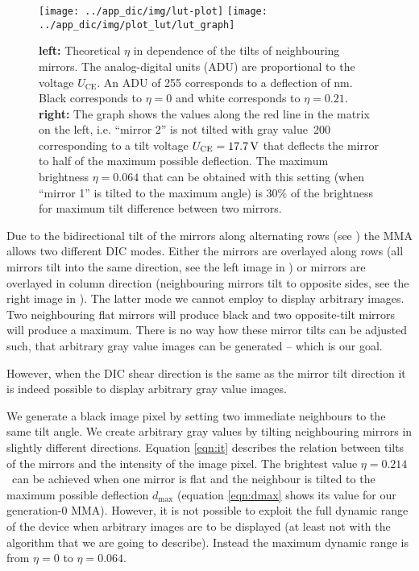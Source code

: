 \begin{figure}[htb]
  \centering
  \texttt{[image: ../app\_dic/img/lut-plot]}
  \texttt{[image: ../app\_dic/img/plot\_lut/lut\_graph]}
  \caption{{\bf left:} Theoretical $\eta$ in dependence of the tilts
    of neighbouring mirrors. The analog-digital units (ADU) are
    proportional to the voltage $U_\textrm{CE}$. An ADU of 255
    corresponds to a deflection of \unit[134]{nm}. Black corresponds
    to $\eta=0$ and white corresponds to $\eta=0.21$. {\bf right:} The
    graph shows the values along the red line in the matrix on the
    left, i.e. ``mirror 2'' is not tilted with gray value~200
    corresponding to a tilt voltage $U_\textrm{CE}=\unit[17.7]{V}$
    that deflects the mirror to half of the maximum possible
    deflection. The maximum brightness $\eta=0.064$ that can be
    obtained with this setting (when ``mirror 1'' is tilted to the
    maximum angle) is $30\%$ of the brightness for maximum tilt
    difference between two mirrors.}
  \label{fig:deflection2}
\end{figure}

Due to the bidirectional tilt of the mirrors along alternating rows
(see ) the MMA allows two different DIC modes.
Either the mirrors are overlayed along rows (all mirrors tilt into the
same direction, see the left image in ) or mirrors
are overlayed in column direction (neighbouring mirrors tilt to
opposite sides, see the right image in ). The
latter mode we cannot employ to display arbitrary images.  Two
neighbouring flat mirrors will produce black and two opposite-tilt
mirrors will produce a maximum. There is no way how these mirror tilts
can be adjusted such, that arbitrary gray value images can be
generated -- which is our goal.

However, when the DIC shear direction is the same as the mirror tilt direction
it is indeed possible to display arbitrary gray value images.

We generate a black image pixel by setting two immediate neighbours to
the same tilt angle. We create arbitrary gray values by tilting
neighbouring mirrors in slightly different directions. Equation
\eqref{eqn:it} describes the relation between tilts of the mirrors and
the intensity of the image pixel. The brightest value
$\eta=0.214$\ can be achieved when one mirror is flat and
the neighbour is tilted to the maximum possible deflection
$d_\textrm{max}$ (equation \eqref{eqn:dmax} shows its value for our
generation-0 MMA).  However, it is not possible to exploit the full
dynamic range of the device when arbitrary images are to be displayed
(at least not with the algorithm that we are going to describe).
Instead the maximum dynamic range is from $\eta=0$ to $\eta=0.064$.

